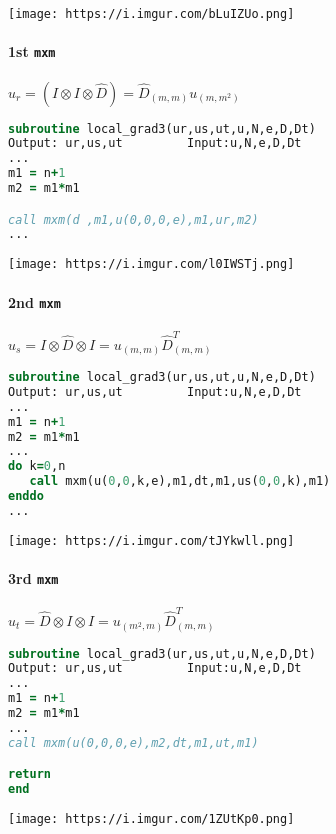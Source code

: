 \documentclass[
  a4paper,
  10pt]{article}
\begin{document}
\texttt{[image: https://i.imgur.com/bLuIZUo.png]}

\hypertarget{st-mxm}{%
\paragraph{\texorpdfstring{1st \texttt{mxm}}{1st mxm}}\label{st-mxm}}

\(u_r = (I \otimes I \otimes \hat{D}) = \hat{D}_{(m, m)} u_{(m, m^2)}\)

\begin{lstlisting}[language=Fortran]
subroutine local_grad3(ur,us,ut,u,N,e,D,Dt)
Output: ur,us,ut         Input:u,N,e,D,Dt
...
m1 = n+1
m2 = m1*m1

call mxm(d ,m1,u(0,0,0,e),m1,ur,m2)
...
\end{lstlisting}

\texttt{[image: https://i.imgur.com/l0IWSTj.png]}

\hypertarget{nd-mxm}{%
\paragraph{\texorpdfstring{2nd \texttt{mxm}}{2nd mxm}}\label{nd-mxm}}

\(u_{s} = I \otimes \hat{D} \otimes I = u_{(m, m)} \hat{D}^T_{(m, m)}\)

\begin{lstlisting}[language=Fortran]
subroutine local_grad3(ur,us,ut,u,N,e,D,Dt)
Output: ur,us,ut         Input:u,N,e,D,Dt
...
m1 = n+1
m2 = m1*m1
...
do k=0,n
   call mxm(u(0,0,k,e),m1,dt,m1,us(0,0,k),m1)
enddo
...
\end{lstlisting}

\texttt{[image: https://i.imgur.com/tJYkwll.png]}

\hypertarget{rd-mxm}{%
\paragraph{\texorpdfstring{3rd \texttt{mxm}}{3rd mxm}}\label{rd-mxm}}

\(u_{t} = \hat{D} \otimes I \otimes I = u_{(m^2, m)} \hat{D}^T_{(m, m)}\)

\begin{lstlisting}[language=Fortran]
subroutine local_grad3(ur,us,ut,u,N,e,D,Dt)
Output: ur,us,ut         Input:u,N,e,D,Dt
...
m1 = n+1
m2 = m1*m1
...
call mxm(u(0,0,0,e),m2,dt,m1,ut,m1)

return
end
\end{lstlisting}

\texttt{[image: https://i.imgur.com/1ZUtKp0.png]}
\end{document}
